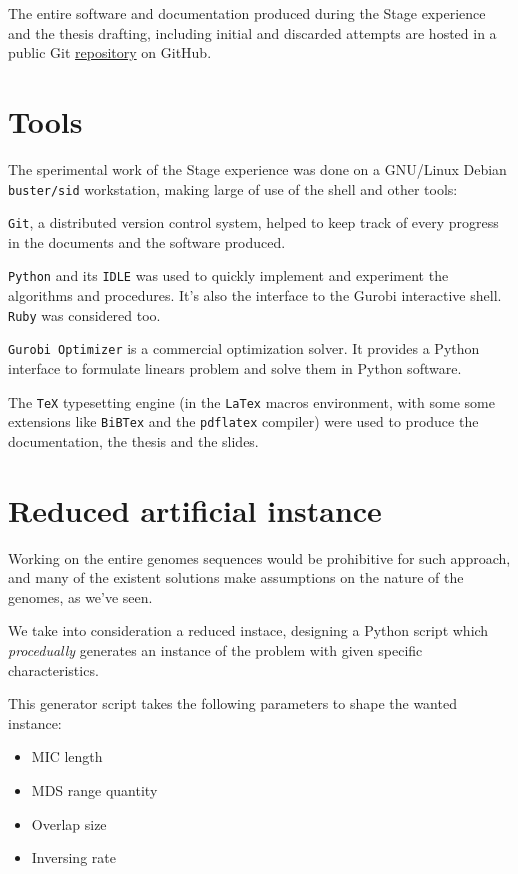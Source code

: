 The entire software and documentation produced during the Stage experience and the thesis drafting, including initial and discarded attempts are hosted in a public Git \href{https://github.com/avivace/dna-recombination}{repository} \cite{avivace_repo} on GitHub.

\section{Tools}
The sperimental work of the Stage experience was done on a GNU/Linux Debian \texttt{buster/sid} workstation, making large of use of the shell and other tools:

\texttt{Git}, a distributed version control system, helped to keep track of every progress in the documents and the software produced.

\texttt{Python} \cite{Rossum:1995:PRM:869369} and its \texttt{IDLE} was used to quickly implement and experiment the algorithms and procedures. It's also the interface to the Gurobi interactive shell. \texttt{Ruby} was considered too.

\texttt{Gurobi Optimizer} \cite{gurobi} is a commercial optimization solver. It provides a Python interface to formulate linears problem and solve them in Python software.

The \texttt{TeX} typesetting engine (in the \texttt{LaTex} macros environment, with some some extensions like \texttt{BiBTex} and the \texttt{pdflatex} compiler) were used to produce the documentation, the thesis and the slides.

\section{Reduced artificial instance}
Working on the entire genomes sequences would be prohibitive for such approach, and many of the existent solutions make assumptions on the nature of the genomes, as we've seen.

We take into consideration a reduced instace, designing a Python script which \textit{procedually} generates an instance of the problem with given specific characteristics.

This generator script takes the following parameters to shape the wanted instance:

\begin{itemize}
	\item MIC length
	\item MDS range quantity
	\item Overlap size
	\item Inversing rate
\end{itemize}

